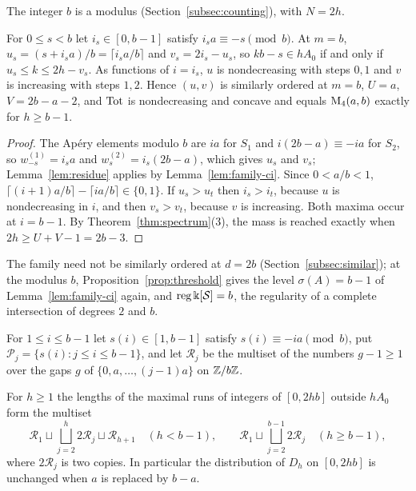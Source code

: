 The integer $b$ is a modulus (Section~\ref{subsec:counting}), with $N=2h$.

\begin{lemma}\label{lem:family-residue}
For $0\le s<b$ let $i_s\in[0,b-1]$ satisfy $i_sa\equiv-s\pmod b$. At $m=b$, $u_s=(s+i_sa)/b=\lceil i_sa/b\rceil$ and $v_s=2i_s-u_s$, so $kb-s\in hA_0$ if and only if $u_s\le k\le2h-v_s$. As functions of $i=i_s$, $u$ is nondecreasing with steps $0,1$ and $v$ is increasing with steps $1,2$. Hence $(u,v)$ is similarly ordered at $m=b$, $U=a$, $V=2b-a-2$, and $\operatorname{Tot}$ is nondecreasing and concave and equals $\operatorname{M}_4(a,b)$ exactly for $h\ge b-1$.
\end{lemma}

\begin{proof}
The Ap\'ery elements modulo $b$ are $ia$ for $S_1$ and $i(2b-a)\equiv-ia$ for $S_2$, so $w^{(1)}_{-s}=i_sa$ and $w^{(2)}_s=i_s(2b-a)$, which gives $u_s$ and $v_s$; Lemma~\ref{lem:residue} applies by Lemma~\ref{lem:family-ci}. Since $0<a/b<1$, $\lceil(i+1)a/b\rceil-\lceil ia/b\rceil\in\{0,1\}$. If $u_s>u_t$ then $i_s>i_t$, because $u$ is nondecreasing in $i$, and then $v_s>v_t$, because $v$ is increasing. Both maxima occur at $i=b-1$. By Theorem~\ref{thm:spectrum}(3), the mass is reached exactly when $2h\ge U+V-1=2b-3$.
\end{proof}

The family need not be similarly ordered at $d=2b$ (Section~\ref{subsec:similar}); at the modulus $b$, Proposition~\ref{prop:threshold} gives the level $\sigma(A)=b-1$ of Lemma~\ref{lem:family-ci} again, and $\operatorname{reg}\Bbbk[\mathcal S]=b$, the regularity of a complete intersection of degrees $2$ and $b$.

For $1\le i\le b-1$ let $s(i)\in[1,b-1]$ satisfy $s(i)\equiv-ia\pmod b$, put $\mathcal P_j=\{s(i):j\le i\le b-1\}$, and let $\mathcal R_j$ be the multiset of the numbers $g-1\ge1$ over the gaps $g$ of $\{0,a,\dots,(j-1)a\}$ on $\mathbb{Z}/b\mathbb{Z}$.

\begin{theorem}\label{thm:family-runs}
For $h\ge1$ the lengths of the maximal runs of integers of $[0,2hb]$ outside $hA_0$ form the multiset
\[
\mathcal R_1\sqcup\bigsqcup_{j=2}^{h}2\mathcal R_j\sqcup\mathcal R_{h+1}\quad(h<b-1),\qquad \mathcal R_1\sqcup\bigsqcup_{j=2}^{b-1}2\mathcal R_j\quad(h\ge b-1),
\]
where $2\mathcal R_j$ is two copies. In particular the distribution of $D_h$ on $[0,2hb]$ is unchanged when $a$ is replaced by $b-a$.
\end{theorem}

